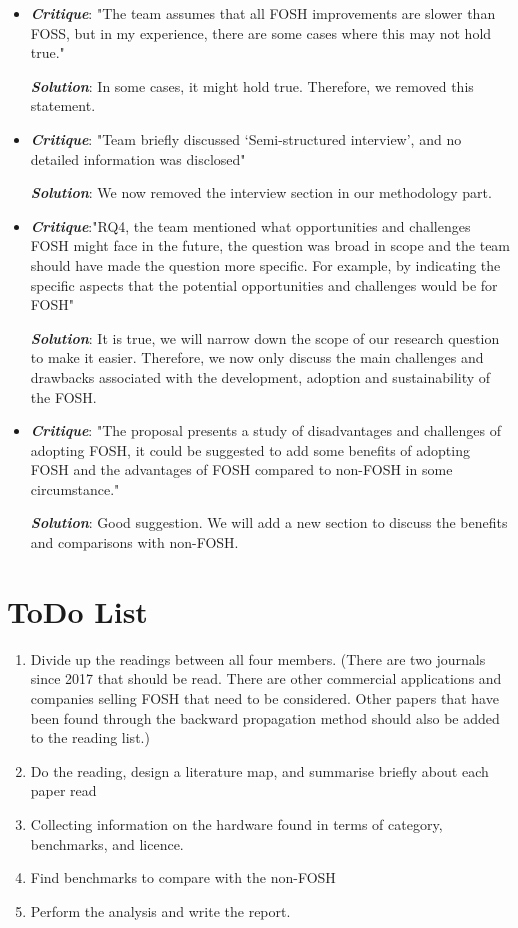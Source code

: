 \documentclass[acmtog]{acmart}
\begin{document}
\begin{itemize}
\item {\textbf{\itshape Critique}}: "The team assumes that all FOSH improvements are slower than FOSS, but in my experience, there are some cases where this may not hold true." 
\par{\textbf{\itshape Solution}}: In some cases, it might hold true. Therefore, we removed this statement.
\item {\textbf{\itshape Critique}}: "Team briefly discussed ‘Semi-structured interview’, and no detailed information was disclosed" 
\par{\textbf{\itshape Solution}}: We now removed the interview section in our methodology part. 
\item {\textbf{\itshape Critique}}:"RQ4, the team mentioned what opportunities and challenges FOSH might face in the future, the question was broad in scope and the team should have made the question more specific. For example, by indicating the specific aspects that the potential opportunities and challenges would be for FOSH" 
\par{\textbf{\itshape Solution}}: It is true, we will narrow down the scope of our research question to make it easier. Therefore, we now only discuss the main challenges and drawbacks associated with the development, adoption and sustainability of the FOSH.  
\item {\textbf{\itshape Critique}}: "The proposal presents a study of disadvantages and challenges of adopting FOSH, it could be suggested to add some benefits of adopting FOSH and the advantages of FOSH compared to non-FOSH in some circumstance." 
\par{\textbf{\itshape Solution}}: Good suggestion. We will add a new section to discuss the benefits and comparisons with non-FOSH.


\end{itemize}

\section{ToDo List}
\begin{enumerate}
\item Divide up the readings between all four members. (There are two journals since 2017 that should be read. 
There are other commercial applications and companies selling FOSH that need to be considered. Other papers that have been found through the backward propagation method should also be added to the reading list.)
\item Do the reading, design a literature map, and summarise briefly about each paper read
\item Collecting information on the hardware found in terms of category, benchmarks, and licence. 
\item Find benchmarks to compare with the non-FOSH
\item Perform the analysis and write the report.
\end{enumerate}
\end{document}
